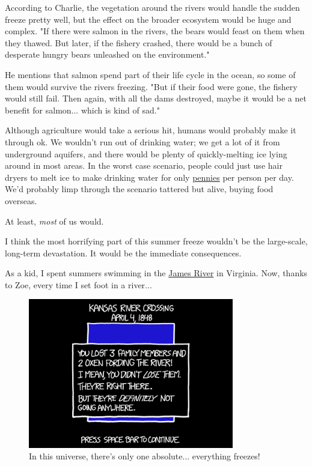 {{According to Charlie, the vegetation around the rivers would handle the sudden freeze pretty well, but the effect on the broader ecosystem would be huge and complex. "If there were salmon in the rivers, the bears would feast on them when they thawed. But later, if the fishery crashed, there would be a bunch of desperate hungry bears unleashed on the environment."}

{He mentions that salmon spend part of their life cycle in the ocean, so some of them would survive the rivers freezing. "But if their food were gone, the fishery would still fail. Then again, with all the dams destroyed, maybe it would be a net benefit for salmon... which is kind of sad."}

{Although agriculture would take a serious hit, humans would probably make it through ok. We wouldn't run out of drinking water; we get a lot of it from underground aquifers, and there would be plenty of quickly-melting ice lying around in most areas. In the worst case scenario, people could just use hair dryers to melt ice to make drinking water for only \href{http://www.wolframalpha.com/input/?i=\%28334+J\%2Fg\%29+*+\%28water+density\%29+*+\%282+liters\%2Fday\%29+*+\%28price+of+electricity\%29+to+USD\%2Fday}{pennies} per person per day. We'd probably limp through the scenario tattered but alive, buying food overseas.}

{At least, \emph{most} of us would.}

{I think the most horrifying part of this summer freeze wouldn't be the large-scale, long-term devastation. It would be the immediate consequences.}

{As a kid, I spent summers swimming in the \href{https://www.google.com/search?tbm=isch&q=james+river+richmond}{James River} in Virginia. Now, thanks to Zoe, every time I set foot in a river...}

\begin{figure}[!htbp]
\centering
\includegraphics[scale=0.5, max width=0.8\textwidth]{imgs/a/121/oregon.png}
\caption{In this universe, there's only one absolute... everything freezes!}
\end{figure}

}
